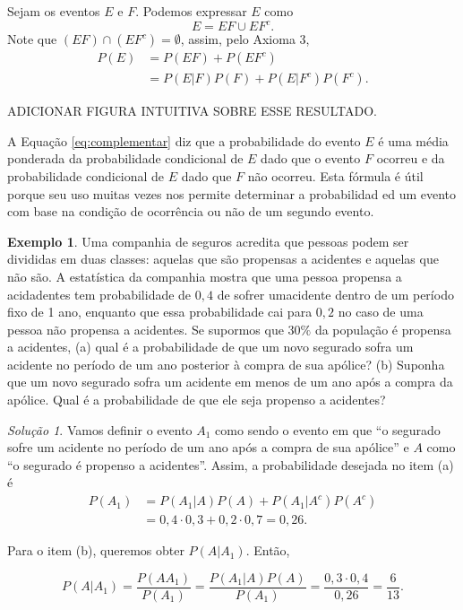 \documentclass[]{book}
\theoremstyle{definition}
\theoremstyle{definition}
\newtheorem{example}{Exemplo}[chapter]
\theoremstyle{definition}
\theoremstyle{remark}
\newtheorem*{solution}{Solução}
\begin{document}
Sejam os eventos \(E\) e \(F\).
Podemos expressar \(E\) como
\[E = EF \cup EF^c.\]
Note que \((EF) \cap (EF^c)=\emptyset\), assim, pelo Axioma 3,
\begin{align}
P(E) &= P(EF) + P(EF^c)\\
&= P(E|F)P(F) + P(E|F^c)P(F^c).
\label{eq:complementar}
\end{align}

ADICIONAR FIGURA INTUITIVA SOBRE ESSE RESULTADO.

A Equação \eqref{eq:complementar} diz que a probabilidade do evento \(E\) é uma média ponderada da probabilidade condicional de \(E\) dado que o evento \(F\) ocorreu e da probabilidade condicional de \(E\) dado que \(F\) não ocorreu.
Esta fórmula é útil porque seu uso muitas vezes nos permite determinar a probabilidad ed um evento com base na condição de ocorrência ou não de um segundo evento.

\begin{example}
\protect\hypertarget{exm:unnamed-chunk-125}{}{\label{exm:unnamed-chunk-125} }Uma companhia de seguros acredita que pessoas podem ser divididas em duas classes: aquelas que são propensas a acidentes e aquelas que não são.
A estatística da companhia mostra que uma pessoa propensa a acidadentes tem probabilidade de \(0{,}4\) de sofrer umacidente dentro de um período fixo de 1 ano, enquanto que essa probabilidade cai para \(0{,}2\) no caso de uma pessoa não propensa a acidentes.
Se supormos que \(30\%\) da população é propensa a acidentes, (a) qual é a probabilidade de que um novo segurado sofra um acidente no período de um ano posterior à compra de sua apólice?
(b) Suponha que um novo segurado sofra um acidente em menos de um ano após a compra da apólice.
Qual é a probabilidade de que ele seja propenso a acidentes?
\end{example}

\begin{solution}
\iffalse{} {Solução. } \fi{}Vamos definir o evento \(A_1\) como sendo o evento em que ``o segurado sofre um acidente no período de um ano após a compra de sua apólice'' e \(A\) como ``o segurado é propenso a acidentes''.
Assim, a probabilidade desejada no item (a) é
\begin{align}
P(A_1) &= P(A_1|A)P(A) + P(A_1|A^c)P(A^c)\\
&= 0{,}4\cdot 0{,}3 + 0{,}2\cdot 0{,}7 = 0{,}26.
\end{align}

Para o item (b), queremos obter \(P(A|A_1)\).
Então,

\[P(A|A_1) = \frac{P(A A_1)}{P(A_1)} = \frac{P(A_1|A)P(A)}{P(A_1)} = \frac{ 0{,}3\cdot 0{,}4}{ 0{,}26} = \frac{6}{13}.\]
\end{solution}
\end{document}
